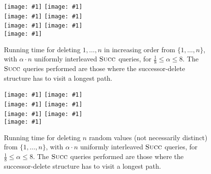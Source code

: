 \documentclass[a4paper]{lipics-v2021}
\newcommand{\plot}[1]{\texttt{[image: \#1]}}
\newcommand{\FuncName}[1]{\textup{\textsc{#1}}}
\newcommand{\Succ}{\FuncName{Succ}}
\begin{document}





\begin{figure}[p]
  \plot{successor-query-worst-case-0.125.pdf} \hfill
  \plot{successor-query-worst-case-0.250.pdf} \\
  \plot{successor-query-worst-case-0.500.pdf} \hfill
  \plot{successor-query-worst-case-1.000.pdf} \\
  \plot{successor-query-worst-case-2.000.pdf} \hfill
  \plot{successor-query-worst-case-4.000.pdf} \\
  \plot{successor-query-worst-case-8.000.pdf} \hfill
  \hfill\begin{minipage}[b]{0.48\textwidth}
    \caption{Running time for deleting $1,\ldots,n$ in increasing order from $\{1,\ldots,n\}$, with $\alpha\cdot n$ uniformly interleaved $\Succ$ queries, for $\frac{1}{8} \leq \alpha \leq 8$. The $\Succ$ queries performed are those where the successor-delete structure has to visit a longest path.}
    \label{fig:plot-all-worst-case}
  \end{minipage}
\end{figure}

\begin{figure}[p]
  \plot{random-deletion-worst-case-query-0.125.pdf} \hfill
  \plot{random-deletion-worst-case-query-0.250.pdf} \\
  \plot{random-deletion-worst-case-query-0.500.pdf} \hfill
  \plot{random-deletion-worst-case-query-1.000.pdf} \\
  \plot{random-deletion-worst-case-query-2.000.pdf} \hfill
  \plot{random-deletion-worst-case-query-4.000.pdf} \\
  \plot{random-deletion-worst-case-query-8.000.pdf} \hfill
  \begin{minipage}[b]{0.48\textwidth}
    \caption{Running time for deleting $n$ random values (not necessarily distinct) from $\{1,\ldots,n\}$, with $\alpha\cdot n$ uniformly interleaved $\Succ$ queries, for $\frac{1}{8} \leq \alpha \leq 8$. The $\Succ$ queries performed are those where the successor-delete structure has to visit a longest path.}
    \label{fig:plot-all-random}
  \end{minipage}
\end{figure}

\end{document}
